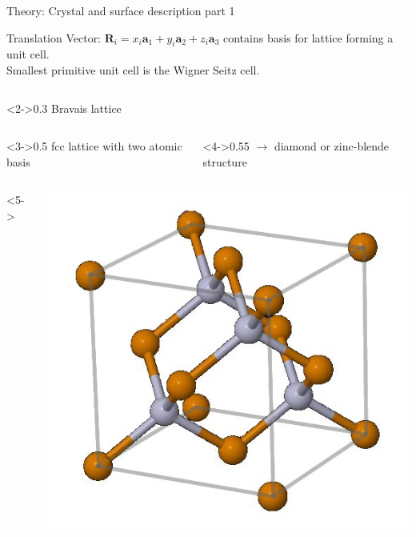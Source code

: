 \begin{frame}{Theory: Crystal and surface description part 1}

	\begin{block}{Translation Vector: $\boldsymbol{R}_i = x_i \boldsymbol{a}_1 + y_i \boldsymbol{a}_2 + z_i \boldsymbol{a}_3$}
		contains basis for lattice forming a unit cell. \\
		Smallest primitive unit cell is the Wigner Seitz cell.
	\end{block}
	\begin{columns}
		\begin{column}<2->{0.3\linewidth}
			Bravais lattice  
		\end{column}
	\end{columns}
	\begin{columns}
		\begin{column}<3->{0.5\linewidth}
			fcc lattice with two atomic basis 
		\end{column}
		\hspace{-1cm}
		\begin{column}<4->{0.55\linewidth}
			$\rightarrow$ diamond or zinc-blende structure 
		\end{column}
	\end{columns}
	\hfill
	\begin{columns}<5->
		\begin{column}{.25\linewidth}
			\centering
			\includegraphics[width=\linewidth]{andere_bilder/zinc_blende}

\end{column}
\end{columns}
\end{frame}
